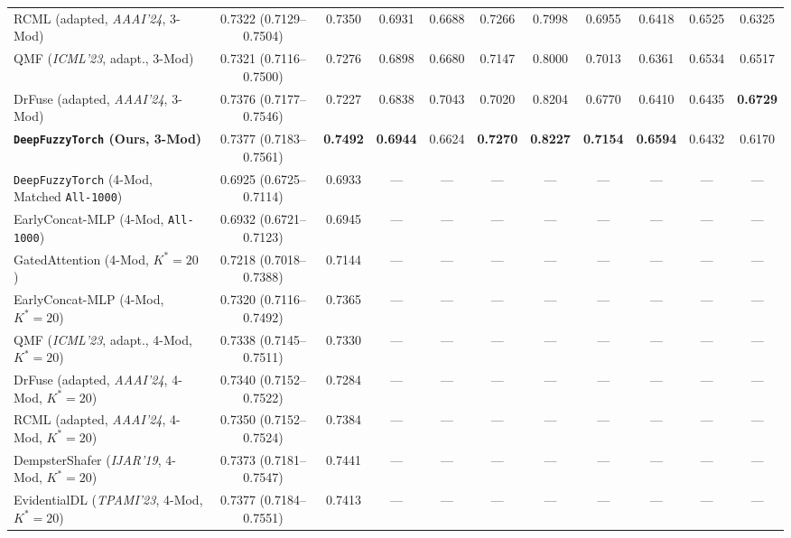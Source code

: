 \documentclass[10pt,twocolumn]{article}
\begin{document}
\begin{table}[t]
{\begin{tabular}{@{}>{\raggedright\arraybackslash}p{5.55cm}cccccccccc@{}}
RCML (adapted, \textit{AAAI'24}, 3-Mod) \cite{xu2024reliable} & 0.7322 (0.7129--0.7504) &
0.7350 & 0.6931 & 0.6688 & 0.7266 & 0.7998 & 0.6955 & 0.6418 & 0.6525 & 0.6325 \\
QMF (\textit{ICML'23}, adapt., 3-Mod) \cite{zhang2023provable} & 0.7321 (0.7116--0.7500) &
0.7276 &
0.6898 & 0.6680 & 0.7147 & 0.8000 & 0.7013 & 0.6361 & 0.6534 & 0.6517 \\
DrFuse (adapted, \textit{AAAI'24}, 3-Mod) \cite{yao2024drfuse} & 0.7376 (0.7177--0.7546) &
0.7227 & 0.6838 & 0.7043 & 0.7020 & 0.8204 & 0.6770 & 0.6410 & 0.6435 & \textbf{0.6729} \\
\textbf{\texttt{DeepFuzzyTorch} (Ours, 3-Mod)} & 0.7377 (0.7183--0.7561) & \textbf{0.7492} &
\textbf{0.6944} & 0.6624 & \textbf{0.7270} & \textbf{0.8227} & \textbf{0.7154} &
\textbf{0.6594} & 0.6432 & 0.6170 \\
\midrule
\texttt{DeepFuzzyTorch} (4-Mod, Matched \texttt{All-1000}) & 0.6925 (0.6725--0.7114) & 0.6933
& --- & --- & --- & --- & --- & --- & --- & --- \\
EarlyConcat-MLP (4-Mod, \texttt{All-1000}) \cite{baltrusaitis2018multimodal} &
0.6932 (0.6721--0.7123) & 0.6945 & --- & --- & --- & --- & --- & --- & --- & --- \\
GatedAttention (4-Mod, $K^*=20$) \cite{arevalo2017gated} & 0.7218 (0.7018--0.7388) & 0.7144 &
--- & --- & --- & --- & --- & --- & --- & --- \\
EarlyConcat-MLP (4-Mod, $K^*=20$) \cite{baltrusaitis2018multimodal} & 0.7320 (0.7116--0.7492) &
0.7365 & --- & --- & --- & --- & --- & --- & --- & --- \\
QMF (\textit{ICML'23}, adapt., 4-Mod, $K^*=20$) \cite{zhang2023provable} & 0.7338
(0.7145--0.7511) &
0.7330 & --- & --- & --- & --- & --- & --- & --- & --- \\
DrFuse (adapted, \textit{AAAI'24}, 4-Mod, $K^*=20$) \cite{yao2024drfuse} &
0.7340 (0.7152--0.7522) & 0.7284 & --- & --- & --- & --- & --- & --- & --- & --- \\
RCML (adapted, \textit{AAAI'24}, 4-Mod, $K^*=20$) \cite{xu2024reliable} &
0.7350 (0.7152--0.7524) & 0.7384 & --- & --- & --- & --- & --- & --- & --- & --- \\
DempsterShafer (\textit{IJAR'19}, 4-Mod, $K^*=20$) \cite{denoeux2019decision} &
0.7373 (0.7181--0.7547) & 0.7441 & --- & --- & --- & --- & --- & --- & --- & --- \\
EvidentialDL (\textit{TPAMI'23}, 4-Mod, $K^*=20$) \cite{han2022trusted} &
0.7377 (0.7184--0.7551) & 0.7413 & --- & --- & --- & --- & --- & --- & --- & --- \\

\end{tabular}}
\end{table}
\end{document}
